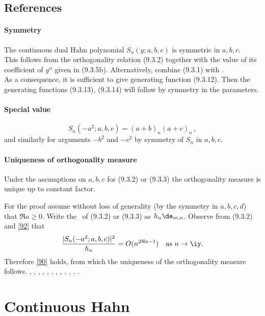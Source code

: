 \documentclass[envcountchap,graybox]{svmono}
\newcounter{rom}
\begin{document}
\subsection*{References}
\label{sec9.3}
%
\paragraph{Symmetry}
The continuous dual Hahn polynomial $S_n(y;a,b,c)$ is symmetric
in $a,b,c$.\\
This follows from the orthogonality relation (9.3.2)
together with the value of its coefficient of $y^n$ given in (9.3.5b).
Alternatively, combine (9.3.1) with .\\
As a consequence, it is sufficient to give generating function (9.3.12). Then the generating
functions (9.3.13), (9.3.14) will follow by symmetry in the parameters.
%
\paragraph{Special value}
\begin{equation}
S_n(-a^2;a,b,c)=(a+b)_n(a+c)_n\,,
\label{92}
\end{equation}
and similarly for arguments $-b^2$ and $-c^2$ by symmetry of $S_n$ in $a,b,c$.
%
\paragraph{Uniqueness of orthogonality measure}
Under the assumptions on $a,b,c$ for (9.3.2) or (9.3.3) the orthogonality
measure is unique up to constant factor.

For the proof assume without
loss of generality (by the symmetry in $a,b,c,d$) that $\Re a\geq0$.
Write the \RHS\ of (9.3.2) or (9.3.3) as $h_n\de_{m,n}$.
Observe from (9.3.2) and \eqref{92} that
\[
\frac{|S_n(-a^2;a,b,c)|^2}{h_n} = O(n^{2\Re a-1})\quad
\hbox{as $n\to\iy$.}
\]
Therefore \eqref{90} holds, from which the uniqueness of the orthogonality
measure follows.
%
\cite{AskeyWilson85}, \cite{IsmailLetVal89}, \cite{Koorn85}, \cite{Koorn88},
\cite{Lesky94II}, \cite{Lesky95I}, \cite{Lesky95II}, \cite{Letessier84},
\cite{Letessier86}, \cite{MimachiII}, \cite{Neuman}, \cite{ValentAssche}.


\section{Continuous Hahn}
\end{document}
